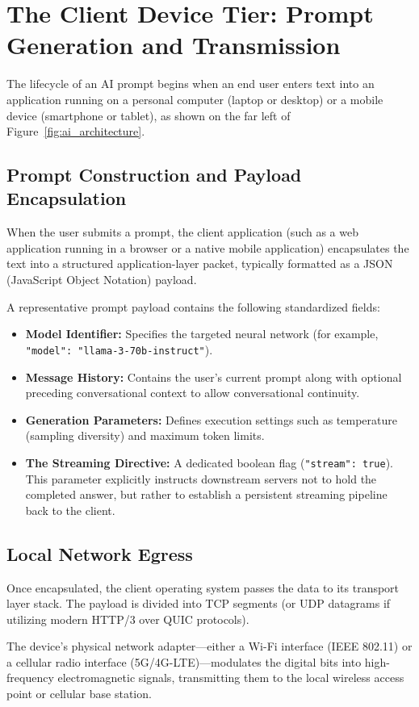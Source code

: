\documentclass[12pt,a4paper]{report}
\begin{document}
\section{The Client Device Tier: Prompt Generation and Transmission}
The lifecycle of an AI prompt begins when an end user enters text into an application running on a personal computer (laptop or desktop) or a mobile device (smartphone or tablet), as shown on the far left of Figure~\ref{fig:ai_architecture}.

\subsection{Prompt Construction and Payload Encapsulation}
When the user submits a prompt, the client application (such as a web application running in a browser or a native mobile application) encapsulates the text into a structured application-layer packet, typically formatted as a JSON (JavaScript Object Notation) payload. 

A representative prompt payload contains the following standardized fields:
\begin{itemize}[leftmargin=1.2cm]
    \item \textbf{Model Identifier:} Specifies the targeted neural network (for example, \texttt{"model": "llama-3-70b-instruct"}).
    \item \textbf{Message History:} Contains the user's current prompt along with optional preceding conversational context to allow conversational continuity.
    \item \textbf{Generation Parameters:} Defines execution settings such as temperature (sampling diversity) and maximum token limits.
    \item \textbf{The Streaming Directive:} A dedicated boolean flag (\texttt{"stream": true}). This parameter explicitly instructs downstream servers not to hold the completed answer, but rather to establish a persistent streaming pipeline back to the client.
\end{itemize}

\subsection{Local Network Egress}
Once encapsulated, the client operating system passes the data to its transport layer stack. The payload is divided into TCP segments (or UDP datagrams if utilizing modern HTTP/3 over QUIC protocols). 

The device's physical network adapter—either a Wi-Fi interface (IEEE 802.11) or a cellular radio interface (5G/4G-LTE)—modulates the digital bits into high-frequency electromagnetic signals, transmitting them to the local wireless access point or cellular base station.
\end{document}
